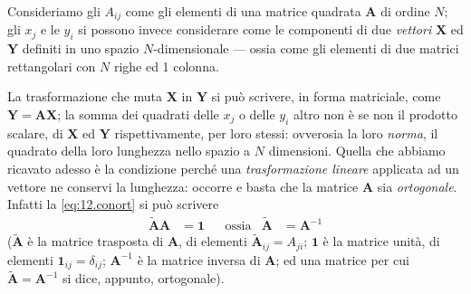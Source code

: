 Consideriamo gli $A_{ij}$ come gli elementi di una matrice
quadrata $\boldsymbol{A}$ di ordine $N$; gli $x_j$ e le
$y_i$ si possono invece considerare come le componenti di
due \emph{vettori} $\boldsymbol{X}$ ed $\boldsymbol{Y}$
definiti in uno spazio $N$-dimensionale --- ossia come gli
elementi di due matrici rettangolari con $N$ righe ed 1
colonna.

La trasformazione che muta $\boldsymbol{X}$ in
$\boldsymbol{Y}$ si pu\`o scrivere, in forma matriciale,
come $\boldsymbol{Y} = \boldsymbol{A} \boldsymbol{X}$; la
somma dei quadrati delle $x_j$ o delle $y_i$ altro non \`e
se non il prodotto scalare, di $\boldsymbol{X}$ ed
$\boldsymbol{Y}$ rispettivamente, per loro stessi: ovverosia
la loro \emph{norma}, il quadrato della loro lunghezza nello
spazio a $N$ dimensioni.  Quella che abbiamo ricavato adesso
\`e la condizione perch\'e una \emph{trasformazione lineare}
applicata ad un vettore ne conservi la lunghezza: occorre e
basta che la matrice $\boldsymbol{A}$ sia \emph{ortogonale}.
Infatti la \eqref{eq:12.conort} si pu\`o scrivere
\begin{align*}
  \boldsymbol{\widetilde A} \boldsymbol{A} &=
  \boldsymbol{1} && \text{ossia}
  & \boldsymbol{\widetilde A} &= \boldsymbol{A}^{-1}
\end{align*}
($\boldsymbol{\widetilde A}$ \`e la matrice trasposta di
$\boldsymbol{A}$, di elementi $\boldsymbol{\widetilde
  A}_{ij} = A_{ji}$; $\boldsymbol{1}$ \`e la matrice
unit\`a, di elementi $\boldsymbol{1}_{ij} = \delta_{ij}$;
$\boldsymbol{A}^{-1}$ \`e la matrice inversa di
$\boldsymbol{A}$; ed una matrice per cui
$\boldsymbol{\widetilde A} = \boldsymbol{A}^{-1}$ si dice,
appunto, ortogonale).

